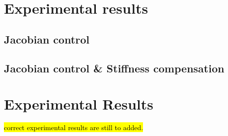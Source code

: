\section{Experimental results}







\subsection{Jacobian control}

\subsection{Jacobian control \& Stiffness compensation}


















\section{Experimental Results}

\hl{correct experimental results are still to added.}






